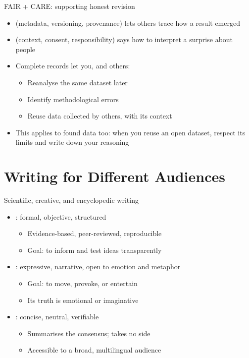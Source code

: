 \documentclass[aspectratio=169]{beamer}
\begin{document}
\begin{frame}{FAIR + CARE: supporting honest revision}
\begin{itemize}
  \item {} (metadata, versioning, provenance) lets others trace how a result emerged
  \item {} (context, consent, responsibility) says how to interpret a surprise about people
  \item Complete records let you, and others:
    \begin{itemize}
      \item Reanalyse the same dataset later
      \item Identify methodological errors
      \item Reuse data collected by others, with its context
    \end{itemize}
  \item This applies to found data too: when you reuse an open dataset, respect its limits and write down your reasoning
\end{itemize}

\end{frame}


\section{Writing for Different Audiences}

\begin{frame}{Scientific, creative, and encyclopedic writing}
\begin{itemize}
  \item {}: formal, objective, structured
    \begin{itemize}
      \item Evidence-based, peer-reviewed, reproducible
      \item Goal: to inform and test ideas transparently
    \end{itemize}
  \item {}: expressive, narrative, open to emotion and metaphor
    \begin{itemize}
      \item Goal: to move, provoke, or entertain
      \item Its truth is emotional or imaginative
    \end{itemize}
  \item {}: concise, neutral, verifiable
    \begin{itemize}
      \item Summarises the consensus; takes no side
      \item Accessible to a broad, multilingual audience
    \end{itemize}
\end{itemize}

\end{frame}
\end{document}
